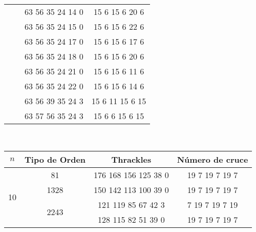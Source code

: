 \begin{tabular}[t]{|c|c|c|c|}
                        &                     & 63 56 35 24 14 0   & 15 6 15 6 20 6  \\ \cline{3-3}
                        &                     & 63 56 35 24 15 0   & 15 6 15 6 22 6  \\ \cline{3-3}
                        &                     & 63 56 35 24 17 0   & 15 6 15 6 17 6  \\ \cline{3-3}
                        &                     & 63 56 35 24 18 0   & 15 6 15 6 20 6  \\ \cline{3-3}
                        &                     & 63 56 35 24 21 0   & 15 6 15 6 11 6  \\ \cline{3-3}
                        &                     & 63 56 35 24 22 0   & 15 6 15 6 14 6  \\ \cline{3-3}
                        &                     & 63 56 39 35 24 3   & 15 6 11 15 6 15  \\ \cline{3-3}
                        &                     & 63 57 56 35 24 3   & 15 6 6 15 6 15  \\ \hline

  \end{tabular}
  \\
  \begin{tabular}[p]{|c|c|c|c|}
    \hline
    $n$                 &Tipo de Orden        & Thrackles            &Número de cruce \\ \hline\hline
    \multirow{4}{*}{10} & 81                  & 176 168 156 125 38 0 & 19 7 19 7 19 7 \\ \cline{2-3}
                        & 1328                &150 142 113 100 39 0  & 19 7 19 7 19 7 \\ \cline{2-3}
                        & \multirow{2}{*}{2243}& 121 119 85 67 42 3  & 7 19 7 19 7 19  \\ \cline{3-3}
                        &                     & 128 115 82 51 39 0   & 19 7 19 7 19 7 \\ \hline
  \end{tabular}
